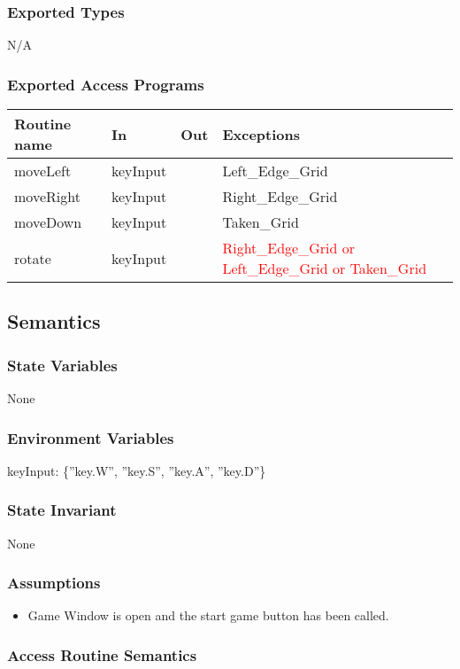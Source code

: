 \documentclass[12pt]{article}
\begin{document}
\subsubsection* {Exported Types}
N/A

\subsubsection* {Exported Access Programs}

\begin{tabular}{| l | l | l | l |}
\hline
\textbf{Routine name} & \textbf{In} & \textbf{Out} & \textbf{Exceptions}\\
\hline
moveLeft & keyInput &  & Left\_Edge\_Grid \\
\hline
moveRight & keyInput  &  & Right\_Edge\_Grid \\
\hline
moveDown & keyInput &  & Taken\_Grid \\
\hline
rotate & keyInput &  &  \textcolor{red}{Right\_Edge\_Grid or Left\_Edge\_Grid or Taken\_Grid} \\
\hline
\end{tabular}

\subsection* {Semantics}

\subsubsection* {State Variables}
None 
\subsubsection* {Environment Variables}
keyInput: \{”key.W”, ”key.S”, ”key.A”, ”key.D”\}

\subsubsection* {State Invariant}
None
\subsubsection* {Assumptions}
\begin{itemize}
    \item Game Window is open and the start game button has been called.
\end{itemize}

\subsubsection* {Access Routine Semantics}
\end{document}
